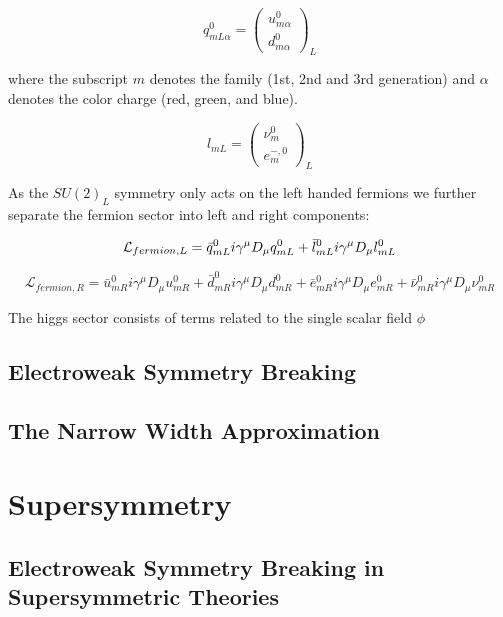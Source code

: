 {\begin{equation}
q^0_{mL\alpha} = \left( \begin{array}{c} u_{m\alpha}^0  \\ d_{m\alpha}^0 \end{array} \right)_L 
\end{equation}

where the subscript $m$ denotes the family (1st, 2nd and 3rd generation) and $\alpha$ denotes the color charge (red, green, and blue).

\begin{equation}
l_{mL} = \left( \begin{array}{c} \nu_{m}^0  \\ e^{-,0}_{m} \end{array} \right)_L 
\end{equation}

As the $SU(2)_L$ symmetry only acts on the left handed fermions we further separate the fermion sector into left and right components:

\begin{equation}
\mathcal{L}_{fermion,L} = \bar{q}^0_{mL} i \gamma^\mu D_\mu q^0_{mL} + \bar{l}^0_{mL} i \gamma^\mu D_\mu l^0_{mL}  \\
\end{equation}

\begin{equation}
\mathcal{L}_{fermion,R} =  \bar{u}^0_{mR} i \gamma^\mu D_\mu u^0_{mR} 
+ \bar{d}^0_{mR} i \gamma^\mu D_\mu d^0_{mR} + \bar{e}^0_{mR} i \gamma^\mu D_\mu e^0_{mR} + \bar{\nu}^0_{mR} i \gamma^\mu D_\mu \nu^0_{mR}
\end{equation}

The higgs sector consists of terms related to the single scalar field $\phi$

\subsection{Electroweak Symmetry Breaking}

\subsection{The Narrow Width Approximation}

\section{Supersymmetry}

\subsection{Electroweak Symmetry Breaking in Supersymmetric Theories}

}
